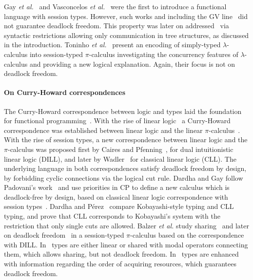\documentclass[main.tex]{subfiles}
\begin{document}
Gay \emph{et al.}~\cite{gaynagarajan03} and Vasconcelos \emph{et al.}~\cite{vasconcelosravara04,vasconcelosgay06} were the first to introduce a functional language with session types. However, such works and including the GV line~\cite{gayvasconcelos10,gayvasconcelos12} did not guarantee deadlock freedom. This property was later on addressed~\cite{lindleymorris15,wadler15} via syntactic restrictions allowing only communication in tree structures, as discussed in the introduction. Toninho \emph{et al.}~\cite{toninhocaires12} present an encoding of simply-typed $\lambda$-calculus into session-typed $\pi$-calculus investigating the concurrency features of $\lambda$-calculus and providing a new logical explanation. Again, their focus is not on deadlock freedom.


\paragraph{On Curry-Howard correspondences}
The Curry-Howard correspondence between logic and types laid the foundation for functional programming~\cite{wadler15}. With the rise of linear logic~\cite{girard87} a Curry-Howard correspondence was established between linear logic and the linear $\pi$-calculus~\cite{abramsky94,bellinscott94}. With the rise of session types, a new correspondence between linear logic and the $\pi$-calculus was proposed first by Caires and Pfenning~\cite{cairespfenning10}, for dual intuitionistic linear logic (DILL), and later by Wadler~\cite{wadler15} for classical linear logic (CLL). The underlying language in both correspondences satisfy deadlock freedom by design, by forbidding cyclic connections via the logical cut rule. Dardha and Gay follow Padovani's work~\cite{padovani14} and use priorities in CP to define a new calculus which is deadlock-free by design, based on classical linear logic correspondence with session types~\cite{wadler12}. Dardha and P\'{e}rez~\cite{dardhaperez15} compare Kobayashi-style typing and CLL typing, and prove that CLL corresponds to Kobayashi's system with the restriction that only single cuts are allowed. Balzer \emph{et al.} study sharing~\cite{balzerpfenning17} and later on deadlock freedom~\cite{balzertoninho19} in a session-typed $\pi$-calculus based on the correspondence with DILL. In~\cite{balzerpfenning17} types are either linear or shared with modal operators connecting them, which allows sharing, but not deadlock freedom. In~\cite{balzertoninho19} types are enhanced with information regarding the order of acquiring resources, which guarantees deadlock freedom.
\end{document}
